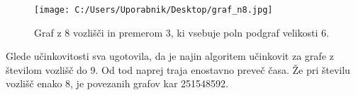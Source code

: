\documentclass[12pt,a4paper]{amsart}
\theoremstyle{definition} %
\theoremstyle{plain} %
\begin{document}
\begin{figure}[h]
    \centering
    \texttt{[image: C:/Users/Uporabnik/Desktop/graf\_n8.jpg]} %
    \caption{Graf z 8 vozlišči in premerom 3, ki vsebuje poln podgraf velikosti 6.}
    \label{fig:slika2}
\end{figure}

\pagebreak

Glede učinkovitosti sva ugotovila, da je najin algoritem učinkovit za grafe z številom vozlišč do 9. Od tod naprej traja enostavno preveč časa. Že pri številu vozlišč enako
8, je povezanih grafov kar 251548592.
\end{document}
